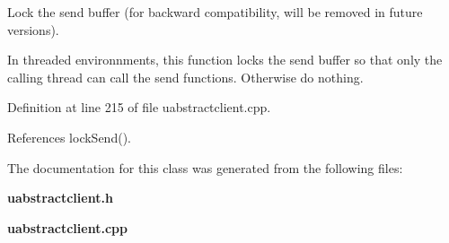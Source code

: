 Lock the send buffer (for backward compatibility, will be removed in future versions). 

In threaded environnments, this function locks the send buffer so that only the calling thread can call the send functions. Otherwise do nothing. 

Definition at line 215 of file uabstractclient.cpp.

References lock\-Send().

The documentation for this class was generated from the following files:\begin{CompactItemize}
\item 
{\bf uabstractclient.h}\item 
{\bf uabstractclient.cpp}\end{CompactItemize}
